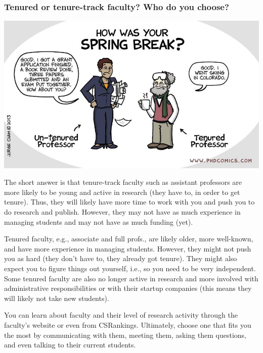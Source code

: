 \documentclass[11pt]{article}
\begin{document}
\subsubsection{Tenured or tenure-track faculty? Who do you choose?}\label{sec:tenure-vs-tenure-track}

      \begin{center}
        \includegraphics[scale=0.4]{c8.png}
      \end{center}


The short answer is that tenure-track faculty such as assistant professors are more likely to be young and active in research (they have to, in order to get tenure). Thus, they will likely have more time to work with you and push you to do research and publish. However, they may not have as much experience in managing students and may not have as much funding (yet).

Tenured faculty, e.g., associate and full profs., are likely older, more well-known, and have more experience in managing students.  However, they might not push you as hard (they don't have to, they already got tenure). They might also expect you to figure things out yourself, i.e., so you need to be very independent.  Some tenured faculty are also no longer active in research and more involved with administrative responsibilities or with their startup companies (this means they will likely not take new students). 

You can learn about faculty and their level of research activity through the faculty's website or even from CSRankings.
Ultimately, choose one that fits you the most by communicating with them, meeting them, asking them questions, and even talking to their current students. 
\end{document}
